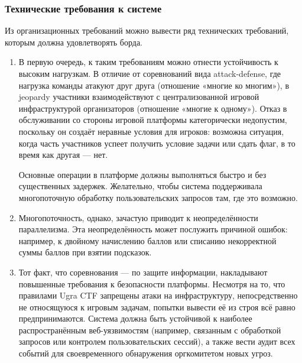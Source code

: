 \subsubsection{Технические требования к системе}
\label{cha:the:board:tech}

Из организационных требований можно вывести ряд технических требований, которым должна удовлетворять борда.

\begin{enumerate}

\item
В первую очередь, к таким требованиям можно отнести устойчивость к высоким нагрузкам. В отличие от соревнований вида attack-defense, где нагрузка команды атакуют друг друга (отношение «многие ко многим»), в jeopardy участники взаимодействуют с централизованной игровой инфраструктурой организаторов (отношение «многие к одному»). Отказ в обслуживании со стороны игровой платформы категорически недопустим, поскольку он создаёт неравные условия для игроков: возможна ситуация, когда часть участников успеет получить условие задачи или сдать флаг, в то время как другая --- нет.

Основные операции в платформе должны выполняться быстро и без существенных задержек. Желательно, чтобы система поддерживала многопоточную обработку пользовательских запросов там, где это возможно.

\item
Многопоточность, однако, зачастую приводит к неопределённости параллелизма. Эта неопределённость может послужить причиной ошибок: например, к двойному начислению баллов или списанию некорректной суммы баллов при взятии подсказок.


\item
Тот факт, что соревнования --- по защите информации, накладывают повышенные требования к безопасности платформы. Несмотря на то, что правилами Ugra CTF запрещены атаки на инфраструктуру, непосредственно не относящуюся к игровым задачам, попытки вывести её из строя всё равно предпринимаются. Система должна быть устойчивой к наиболее распространённым веб-уязвимостям (например, связанным с обработкой запросов или контролем пользовательских сессий), а также вести аудит всех событий для своевременного обнаружения оргкомитетом новых угроз.
\end{enumerate}

